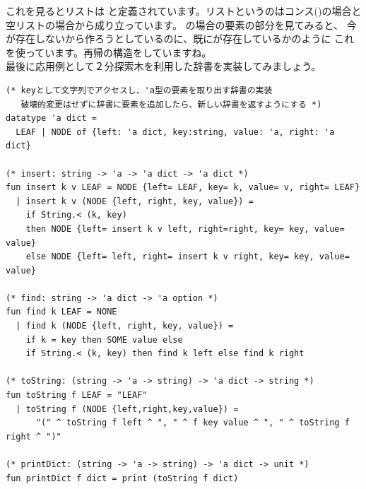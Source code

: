 \documentclass[11pt,a4paper]{jarticle}
\begin{document}
これを見るとリストは
と定義されています。リストというのはコンス(\prog{::})の場合と空リストの場合から成り立っています。
\prog{::}の場合の要素の部分を見てみると、
今が存在しないから作ろうとしているのに、既にが存在しているかのように
これを使っています。再帰の構造をしていますね。\\


最後に応用例として２分探索木を利用した辞書を実装してみましょう。

\begin{lstlisting}[caption=２分探索木による辞書の実装,label=code:dict]
(* keyとして文字列でアクセスし、'a型の要素を取り出す辞書の実装
   破壊的変更はせずに辞書に要素を追加したら、新しい辞書を返すようにする *)
datatype 'a dict =
  LEAF | NODE of {left: 'a dict, key:string, value: 'a, right: 'a dict}

(* insert: string -> 'a -> 'a dict -> 'a dict *)
fun insert k v LEAF = NODE {left= LEAF, key= k, value= v, right= LEAF}
  | insert k v (NODE {left, right, key, value}) =
    if String.< (k, key)
    then NODE {left= insert k v left, right=right, key= key, value= value}
    else NODE {left= left, right= insert k v right, key= key, value= value}

(* find: string -> 'a dict -> 'a option *)
fun find k LEAF = NONE
  | find k (NODE {left, right, key, value}) =
    if k = key then SOME value else
    if String.< (k, key) then find k left else find k right

(* toString: (string -> 'a -> string) -> 'a dict -> string *)
fun toString f LEAF = "LEAF"
  | toString f (NODE {left,right,key,value}) =
      "(" ^ toString f left ^ ", " ^ f key value ^ ", " ^ toString f right ^ ")"

(* printDict: (string -> 'a -> string) -> 'a dict -> unit *)
fun printDict f dict = print (toString f dict)
\end{lstlisting}
\end{document}
